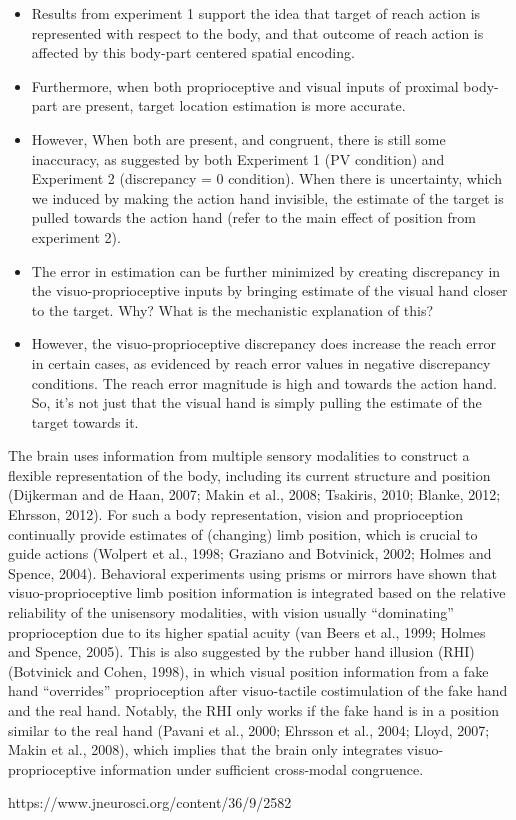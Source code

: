 \begin{itemize}
    \item Results from experiment 1 support the idea that target of reach action is represented with respect to the body, and that outcome of reach action is affected by this body-part centered spatial encoding.
    \item Furthermore, when both proprioceptive and visual inputs of proximal body-part are present, target location estimation is more accurate.
    \item However, When both are present, and congruent, there is still some inaccuracy, as suggested by both Experiment 1 (PV condition) and Experiment 2 (discrepancy = 0 condition). When there is uncertainty, which we induced by making the action hand invisible, the estimate of the target is pulled towards the action hand (refer to the main effect of position from experiment 2).
    \item The error in estimation can be further minimized by creating discrepancy in the visuo-proprioceptive inputs by bringing estimate of the visual hand closer to the target. Why? What is the mechanistic explanation of this?
    \item However, the visuo-proprioceptive discrepancy does increase the reach error in certain cases, as evidenced by reach error values in negative discrepancy conditions. The reach error magnitude is high and towards the action hand. So, it's not just that the visual hand is simply pulling the estimate of the target towards it. 

\end{itemize}


The brain uses information from multiple sensory modalities to construct a flexible representation of the body, including its current structure and position (Dijkerman and de Haan, 2007; Makin et al., 2008; Tsakiris, 2010; Blanke, 2012; Ehrsson, 2012). For such a body representation, vision and proprioception continually provide estimates of (changing) limb position, which is crucial to guide actions (Wolpert et al., 1998; Graziano and Botvinick, 2002; Holmes and Spence, 2004). Behavioral experiments using prisms or mirrors have shown that visuo-proprioceptive limb position information is integrated based on the relative reliability of the unisensory modalities, with vision usually “dominating” proprioception due to its higher spatial acuity (van Beers et al., 1999; Holmes and Spence, 2005). This is also suggested by the rubber hand illusion (RHI) (Botvinick and Cohen, 1998), in which visual position information from a fake hand “overrides” proprioception after visuo-tactile costimulation of the fake hand and the real hand. Notably, the RHI only works if the fake hand is in a position similar to the real hand (Pavani et al., 2000; Ehrsson et al., 2004; Lloyd, 2007; Makin et al., 2008), which implies that the brain only integrates visuo-proprioceptive information under sufficient cross-modal congruence.

https://www.jneurosci.org/content/36/9/2582

